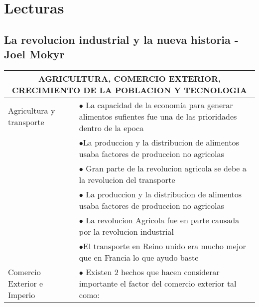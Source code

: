\section{Lecturas}
\subsection{La revolucion industrial y la nueva historia - Joel Mokyr}

\begingroup
\setlength{\tabcolsep}{12pt} %
\renewcommand{\arraystretch}{1.5} %
\begin{tabular}{p{3cm}|p{11cm}}
  \multicolumn{2}{c}{\large AGRICULTURA, COMERCIO EXTERIOR, CRECIMIENTO DE LA POBLACION Y TECNOLOGIA}                                                                                                                      \\ \hline
  Agricultura y transporte     & $\bullet$ La capacidad de la economía para generar alimentos sufientes fue una de las prioridades dentro de la epoca                                                                      \\
                               & $\bullet$La produccion y la distribucion de alimentos usaba factores de produccion no agricolas                                                                                           \\
                               & $\bullet$ Gran parte de la revolucion agricola se debe a la revolucion del transporte                                                                                                     \\
                               & $\bullet$ La produccion y la distribucion de alimentos usaba factores de produccion no agricolas                                                                                          \\
                               & $\bullet$ La revolucion Agricola fue en parte causada por la revolucion industrial                                                                                                        \\
                               & $\bullet$El transporte en Reino unido era mucho mejor que en Francia lo que ayudo baste                                                                                                   \\ \hline
  Comercio  Exterior e Imperio & $\bullet$ Existen 2 hechos que hacen considerar importante el factor del comercio exterior tal como:                                                                                      \\

\end{tabular}
